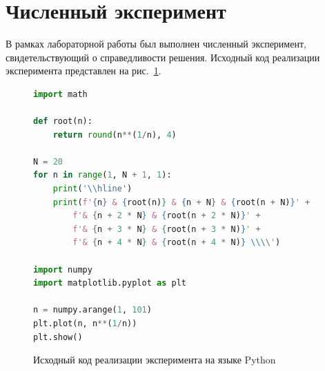 \documentclass[labwork]{fefudoc}
\begin{document}
\section{Численный эксперимент}
В рамках лабораторной работы был выполнен численный эксперимент, свидетельствующий о справедливости решения.
Исходный код реализации эксперимента представлен на рис.~\ref{исходник}.

\begin{figure}
\centering
\begin{lstlisting}[language=Python]
import math

def root(n):
	return round(n**(1/n), 4)

N = 20
for n in range(1, N + 1, 1):
	print('\\hline')
	print(f'{n} & {root(n)} & {n + N} & {root(n + N)}' +
		f'& {n + 2 * N} & {root(n + 2 * N)}' +
		f'& {n + 3 * N} & {root(n + 3 * N)}' +
		f'& {n + 4 * N} & {root(n + 4 * N)} \\\\')

import numpy
import matplotlib.pyplot as plt

n = numpy.arange(1, 101)
plt.plot(n, n**(1/n))
plt.show()
\end{lstlisting}
\caption{Исходный код реализации эксперимента на языке Python}
\label{исходник}
\end{figure}
\end{document}
